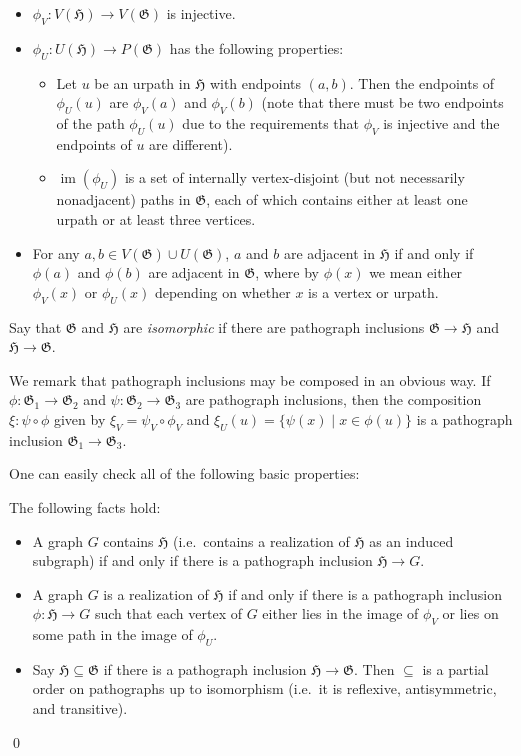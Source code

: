 \documentclass{article}
\newcommand{\Gf}{\mathfrak{G}}
\newcommand{\Hf}{\mathfrak{H}}
\DeclareMathOperator{\im}{im}
\begin{document}
\begin{itemize}
    \item $\phi_V:V(\Hf)\to V(\Gf)$ is injective.
    \item $\phi_U:U(\Hf)\to P(\Gf)$ has the following properties:
    \begin{itemize}
        \item Let $u$ be an urpath in $\Hf$ with endpoints $(a,b)$. Then the endpoints of $\phi_U(u)$ are $\phi_V(a)$ and $\phi_V(b)$ (note that there must be two endpoints of the path $\phi_U(u)$ due to the requirements that $\phi_V$ is injective and the endpoints of $u$ are different).
        \item $\im(\phi_U)$ is a set of internally vertex-disjoint (but not necessarily nonadjacent) paths in $\Gf$, each of which contains either at least one urpath or at least three vertices.
    \end{itemize}
    \item For any $a,b\in V(\Gf)\cup U(\Gf)$, $a$ and $b$ are adjacent in $\Hf$ if and only if $\phi(a)$ and $\phi(b)$ are adjacent in $\Gf$, where by $\phi(x)$ we mean either $\phi_V(x)$ or $\phi_U(x)$ depending on whether $x$ is a vertex or urpath.
\end{itemize}
Say that $\Gf$ and $\Hf$ are \textit{isomorphic} if there are pathograph inclusions $\Gf\to\Hf$ and $\Hf\to\Gf$.

We remark that pathograph inclusions may be composed in an obvious way. If $\phi:\Gf_1\to \Gf_2$ and $\psi:\Gf_2\to \Gf_3$ are pathograph inclusions, then the composition $\xi:\psi\circ\phi$ given by $\xi_V=\psi_V\circ\phi_V$ and $\xi_U(u)=\{\psi(x)\mid x\in \phi(u)\}$ is a pathograph inclusion $\Gf_1\to \Gf_3$.

One can easily check all of the following basic properties:
\begin{proposition}\label{prop:basicfacts}
The following facts hold:
\begin{itemize}
    \item A graph $G$ contains $\Hf$ (i.e.\ contains a realization of $\Hf$ as an induced subgraph) if and only if there is a pathograph inclusion $\Hf\to G$.
    \item A graph $G$ is a realization of $\Hf$ if and only if there is a pathograph inclusion $\phi:\Hf\to G$ such that each vertex of $G$ either lies in the image of $\phi_V$ or lies on some path in the image of $\phi_U$.
    \item Say $\Hf \subseteq \Gf$ if there is a pathograph inclusion $\Hf\to\Gf$. Then $\subseteq$ is a partial order on pathographs up to isomorphism (i.e.\ it is reflexive, antisymmetric, and transitive).
\end{itemize}\qed
\end{proposition}
\end{document}
